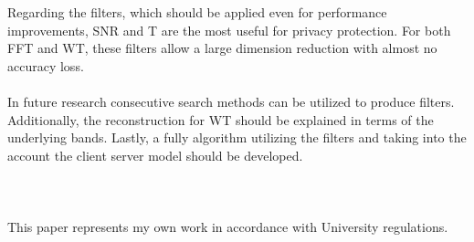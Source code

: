 \documentclass{article}
\begin{document}
Regarding the filters, which should be applied even for performance improvements, 
SNR and T are the most useful for privacy protection. For both FFT and WT, these filters allow a 
large dimension reduction with almost no accuracy loss.  
\\\\
In future research consecutive search methods can be utilized to produce filters. Additionally, the reconstruction 
for WT should be explained in terms of the underlying bands. Lastly, a fully algorithm utilizing the filters and taking 
into the account the client server model should be developed.  
\\\\\\\\
This paper represents my own work in accordance with University regulations.              
\\\\\\\\


 
\end{document}
